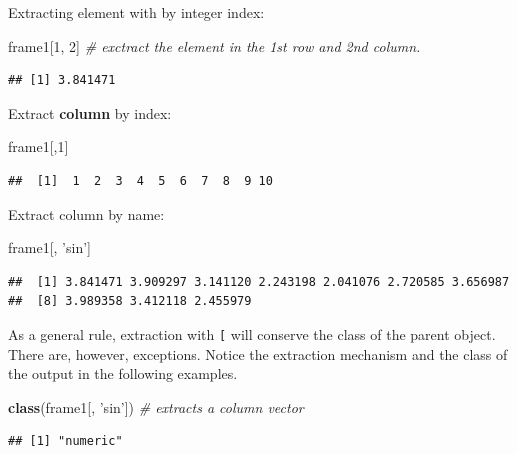 \documentclass[]{book}
\newenvironment{Shaded}{\begin{snugshade}}{\end{snugshade}}
\newcommand{\CommentTok}[1]{\textcolor[rgb]{0.56,0.35,0.01}{\textit{#1}}}
\newcommand{\DecValTok}[1]{\textcolor[rgb]{0.00,0.00,0.81}{#1}}
\newcommand{\KeywordTok}[1]{\textcolor[rgb]{0.13,0.29,0.53}{\textbf{#1}}}
\newcommand{\NormalTok}[1]{#1}
\newcommand{\StringTok}[1]{\textcolor[rgb]{0.31,0.60,0.02}{#1}}
\theoremstyle{definition}
\theoremstyle{definition}
\theoremstyle{definition}
\theoremstyle{remark}
\begin{document}
Extracting element with by integer index:

\begin{Shaded}
\begin{Highlighting}[]
\NormalTok{frame1[}\DecValTok{1}\NormalTok{, }\DecValTok{2}\NormalTok{]  }\CommentTok{# exctract the element in the 1st row and 2nd column.}
\end{Highlighting}
\end{Shaded}

\begin{verbatim}
## [1] 3.841471
\end{verbatim}

Extract \textbf{column} by index:

\begin{Shaded}
\begin{Highlighting}[]
\NormalTok{frame1[,}\DecValTok{1}\NormalTok{]                              }
\end{Highlighting}
\end{Shaded}

\begin{verbatim}
##  [1]  1  2  3  4  5  6  7  8  9 10
\end{verbatim}

Extract column by name:

\begin{Shaded}
\begin{Highlighting}[]
\NormalTok{frame1[, }\StringTok{'sin'}\NormalTok{]}
\end{Highlighting}
\end{Shaded}

\begin{verbatim}
##  [1] 3.841471 3.909297 3.141120 2.243198 2.041076 2.720585 3.656987
##  [8] 3.989358 3.412118 2.455979
\end{verbatim}

As a general rule, extraction with \texttt{{[}} will conserve the class of the parent object.
There are, however, exceptions.
Notice the extraction mechanism and the class of the output in the following examples.

\begin{Shaded}
\begin{Highlighting}[]
\KeywordTok{class}\NormalTok{(frame1[, }\StringTok{'sin'}\NormalTok{])  }\CommentTok{# extracts a column vector}
\end{Highlighting}
\end{Shaded}

\begin{verbatim}
## [1] "numeric"
\end{verbatim}
\end{document}
